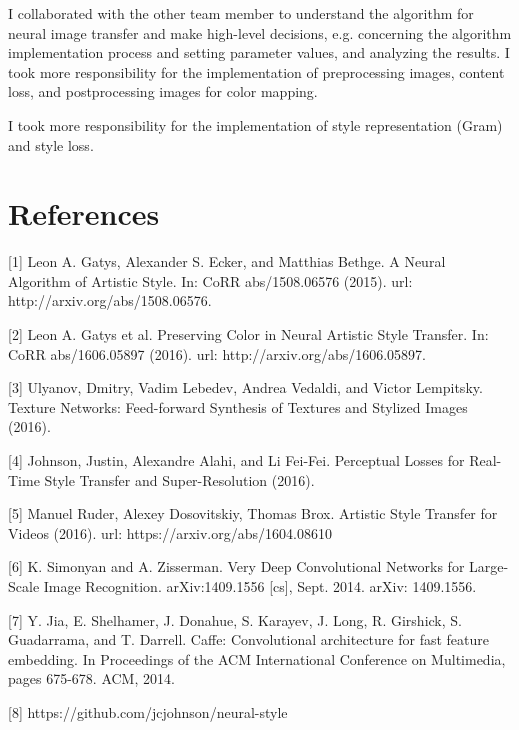 \documentclass[10pt,twocolumn,letterpaper]{article}
\begin{document}
I collaborated with the other team member to understand the algorithm for neural image transfer and make high-level decisions, e.g. concerning the algorithm implementation process and setting parameter values, and analyzing the results. I took more responsibility for the implementation of preprocessing images, content loss, and postprocessing images for color mapping.

I took more responsibility for the implementation of style representation (Gram) and style loss.

\section{References}

[1] Leon A. Gatys, Alexander S. Ecker, and Matthias Bethge. A Neural Algorithm of Artistic Style. In: CoRR abs/1508.06576 (2015). url: http://arxiv.org/abs/1508.06576.

[2] Leon A. Gatys et al. Preserving Color in Neural Artistic Style Transfer. In: CoRR abs/1606.05897 (2016). url: http://arxiv.org/abs/1606.05897.

[3] Ulyanov, Dmitry, Vadim Lebedev, Andrea Vedaldi, and Victor Lempitsky. Texture Networks: Feed-forward Synthesis of Textures and Stylized Images (2016).

[4] Johnson, Justin, Alexandre Alahi, and Li Fei-Fei. Perceptual Losses for Real-Time Style Transfer and Super-Resolution (2016).

[5] Manuel Ruder, Alexey Dosovitskiy, Thomas Brox. Artistic Style Transfer for Videos (2016). url: https://arxiv.org/abs/1604.08610

[6] K. Simonyan and A. Zisserman. Very Deep Convolutional Networks for Large-Scale Image Recognition. arXiv:1409.1556 [cs], Sept. 2014. arXiv: 1409.1556.

[7] Y. Jia, E. Shelhamer, J. Donahue, S. Karayev, J. Long, R. Girshick, S. Guadarrama, and T. Darrell. Caffe: Convolutional
architecture for fast feature embedding. In Proceedings of the ACM International Conference on Multimedia, pages 675-678. ACM, 2014.

[8] https://github.com/jcjohnson/neural-style

{\small


}
\end{document}
